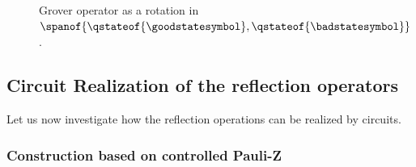 \begin{figure}[t]
    \begin{center}
        
    \end{center}
    \caption{Grover operator as a rotation in $\spanof{\qstateof{\goodstatesymbol},\qstateof{\badstatesymbol}}$.}
    \label{fig:rotationSketch}
\end{figure}

\subsection{Circuit Realization of the reflection operators}

Let us now investigate how the reflection operations can be realized by circuits.



\subsubsection{Construction based on controlled Pauli-Z}

